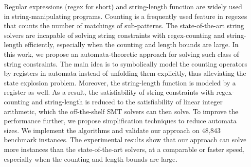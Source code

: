Regular expressions (regex for short) and string-length function are widely used in string-manipulating programs. Counting is a frequently used feature in regexes that counts the number of matchings of sub-patterns. 
The state-of-the-art string solvers are incapable of solving string constraints with regex-counting and string-length eﬀiciently, especially when the counting and length bounds are large. 
In this work, we propose an automata-theoretic approach for solving such class of string constraints. 
The main idea is to symbolically model the counting operators by registers in automata instead of unfolding them explicitly, thus alleviating the state explosion problem. Moreover, the string-length function is modeled by a register as well. 
As a result, the satisfiability of string constraints with regex-counting and string-length is reduced to the satisfiability of linear integer arithmetic, which the off-the-shelf SMT solvers can then solve. 
To improve the performance further, we propose simplification techniques to reduce automata sizes. We implement the algorithms and validate our approach on 48,843 benchmark instances. 
The experimental results show that our approach can solve more instances than the state-of-the-art solvers, at a comparable or faster speed, especially when the counting and length bounds are large.

%
